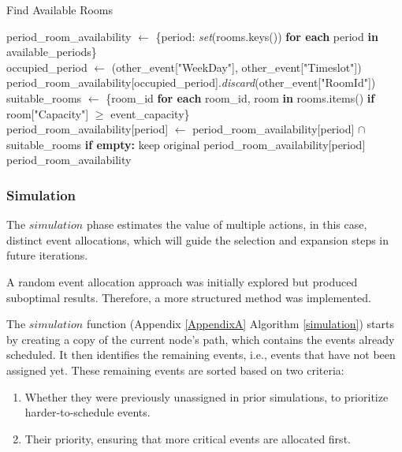 \begin{algorithm}
\caption{Find Available Rooms}\label{find_available_rooms}
\begin{algorithmic}[1]
    \State period\_room\_availability $\gets$ \{period: \textit{set}(rooms.keys()) \textbf{for each} period \textbf{in} available\_periods\}
    \\
        \State occupied\_period $\gets$ (other\_event["WeekDay"], other\_event["Timeslot"])
            \State period\_room\_availability[occupied\_period].\textit{discard}(other\_event["RoomId"])
        \EndIf
    \EndFor
    \\
    \State suitable\_rooms $\gets$ \{room\_id \textbf{for each} room\_id, room \textbf{in} rooms.items() \textbf{if} room["Capacity"] $\geq$ event\_capacity\}
    \\
            \State period\_room\_availability[period] $\gets$ period\_room\_availability[period] $\cap$ suitable\_rooms 
            \State \textbf{if empty:} keep original period\_room\_availability[period]
        \EndIf
    \EndFor
    \\
    \State \Return period\_room\_availability
\EndFunction
\end{algorithmic}
\end{algorithm}

\subsubsection{Simulation}

The \(simulation\) phase estimates the value of multiple actions, in this case, distinct event allocations, which will guide the selection and expansion steps in future iterations. 

A random event allocation approach was initially explored but produced suboptimal results. Therefore, a more structured method was implemented.

The \(simulation\) function (Appendix \ref{AppendixA} Algorithm \ref{simulation}) starts by creating a copy of the current node's path, which contains the events already scheduled. It then identifies the remaining events, i.e., events that have not been assigned yet. These remaining events are sorted based on two criteria:
\begin{enumerate}
\item Whether they were previously unassigned in prior simulations, to prioritize harder-to-schedule events.
\item Their priority, ensuring that more critical events are allocated first.
\end{enumerate}

